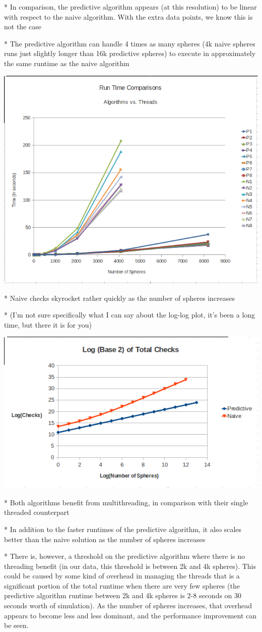 \documentclass[conference]{IEEEtran}
\begin{document}
* In comparison, the predictive algorithm appears (at this resolution) to be linear with respect to the naive algorithm.  With the extra data points, we know this is not the case

* The predictive algorithm can handle 4 times as many spheres (4k naive spheres runs just slightly longer than 16k predictive spheres) to execute in approximately the same runtime as the naive algorithm

\begin{center}
	\includegraphics[width=.45\textwidth]{runtime_comparison.png}
\end{center}

* Naive checks skyrocket rather quickly as the number of spheres increases

* (I'm not sure specifically what I can say about the log-log plot, it's been a long time, but there it is for you)

\begin{center}
	\includegraphics[width=.45\textwidth]{log_total_checks_comparison.png}
\end{center}

* Both algorithms benefit from multithreading, in comparison with their single threaded counterpart

* In addition to the faster runtimes of the predictive algorithm, it also scales better than the naive solution as the number of spheres increases

* There is, however, a threshold on the predictive algorithm where there is no threading benefit (in our data, this threshold is between 2k and 4k spheres).  This could be caused by some kind of overhead in managing the threads that is a significant portion of the total runtime when there are very few spheres (the predictive algorithm runtime between 2k and 4k spheres is 2-8 seconds on 30 seconds worth of simulation).  As the number of spheres increases, that overhead appears to become less and less dominant, and the performance improvement can be seen.
\end{document}
